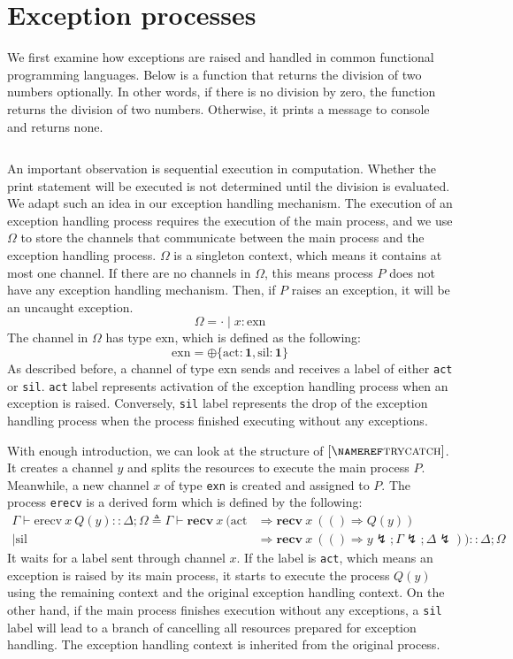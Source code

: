 \documentclass[12pt, openany]{memoir}
\newcommand*{\recv}[2]{\textbf{recv}\ #1\ #2}
\newcommand*{\cancel}[1]{#1 \lightning}
\begin{document}
\section{Exception processes}\label{sec:exnproc}
We first examine how exceptions are raised and handled in common functional programming languages. 
Below is a function that returns the division of two numbers optionally. In other words,
if there is no division by zero, the function returns the division of two numbers.
Otherwise, it prints a message to console and returns none. 
\inputminted{ocaml}{code/div.ml} 
An important observation is sequential execution in computation. 
Whether the print statement will be executed is not determined until the division is evaluated. 
We adapt such an idea in our exception handling mechanism. 
The execution of an exception handling process requires the execution of the main process, 
and we use $\Omega$ to store the channels that communicate between the main process and the exception handling process.
$\Omega$ is a singleton context, 
which means it contains at most one channel. If there are no channels in $\Omega$, 
this means process $P$ does not have any exception handling mechanism. 
Then, if $P$ raises an exception, it will be an uncaught exception. 
\[
  \Omega = \cdot \mid x : \text{exn}
\]
The channel in $\Omega$ has type $\text{exn}$, which is defined as the following:
\[
  \text{exn} = \oplus\{\text{act} : \textbf{1}, \text{sil} : \textbf{1}\}
\]
As described before, a channel of type $\text{exn}$ sends and receives a label of either \texttt{act} or \texttt{sil}. 
\texttt{act} label represents activation of the exception handling process when an exception is raised.
Conversely, \texttt{sil} label represents the drop of the exception handling process when the process finished executing without any exceptions.

With enough introduction, we can look at the structure of $\ruleref{trycatch}$. 
It creates a channel $y$ and splits the resources to execute the main process $P$.
Meanwhile, a new channel $x$ of type \texttt{exn} is created and assigned to $P$.
The process \texttt{erecv} is a derived form which is defined by the following:
\begin{align*}
  \Gamma \vdash \text{erecv}\ x\ Q(y) :: \Delta ; \Omega \triangleq \Gamma \vdash \recv{x}{(\text{act} &\Rightarrow \recv{x}{(() \Rightarrow Q(y))} \\ 
  \mid \text{sil} &\Rightarrow \recv{x}{(() \Rightarrow \cancel{y}; \cancel{\Gamma}; \cancel{\Delta})})} :: \Delta; \Omega
\end{align*}
It waits for a label sent through channel $x$. If the label is \texttt{act}, 
which means an exception is raised by its main process, 
it starts to execute the process $Q(y)$ using the remaining context and the original exception handling context. 
On the other hand, if the main process finishes execution without any exceptions, 
a \texttt{sil} label will lead to a branch of cancelling all resources prepared for exception handling. 
The exception handling context is inherited from the original process.
\end{document}
